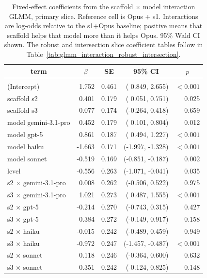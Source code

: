 \documentclass[10pt]{article} %
\begin{document}
    \begin{table}[h]
        \caption{Fixed-effect coefficients from the scaffold $\times$ model interaction GLMM, primary slice. Reference cell is Opus + s1. Interactions are log-odds relative to the s1+Opus baseline; positive means that scaffold helps that model more than it helps Opus. 95\% Wald CI shown. The robust and intersection slice coefficient tables follow in Table~\ref{tab:glmm_interaction_robust_intersection}.}
        \label{tab:h2_interaction_primary}
        \begin{center}
        \footnotesize
        \begin{tabular}{lrrrr}
            \multicolumn{1}{c}{\bf term} & \multicolumn{1}{c}{\bf $\beta$} & \multicolumn{1}{c}{\bf SE} & \multicolumn{1}{c}{\bf 95\% CI} & \multicolumn{1}{c}{\bf $p$} \\
            \hline \\
            (Intercept)                 &  1.752 & 0.461 & ( 0.849,  2.655) & $<0.001$ \\
            scaffold s2                 &  0.401 & 0.179 & ( 0.051,  0.751) & 0.025 \\
            scaffold s3                 &  0.077 & 0.174 & (-0.264,  0.418) & 0.659 \\
            model gemini-3.1-pro        &  0.452 & 0.179 & ( 0.101,  0.804) & 0.012 \\
            model gpt-5                 &  0.861 & 0.187 & ( 0.494,  1.227) & $<0.001$ \\
            model haiku                 & -1.663 & 0.171 & (-1.997, -1.328) & $<0.001$ \\
            model sonnet                & -0.519 & 0.169 & (-0.851, -0.187) & 0.002 \\
            level                       & -0.556 & 0.263 & (-1.071, -0.041) & 0.035 \\
            s2 $\times$ gemini-3.1-pro  &  0.008 & 0.262 & (-0.506,  0.522) & 0.975 \\
            s3 $\times$ gemini-3.1-pro  &  1.021 & 0.273 & ( 0.487,  1.555) & $<0.001$ \\
            s2 $\times$ gpt-5           & -0.214 & 0.270 & (-0.743,  0.315) & 0.427 \\
            s3 $\times$ gpt-5           &  0.384 & 0.272 & (-0.149,  0.917) & 0.158 \\
            s2 $\times$ haiku           & -0.015 & 0.242 & (-0.489,  0.459) & 0.949 \\
            s3 $\times$ haiku           & -0.972 & 0.247 & (-1.457, -0.487) & $<0.001$ \\
            s2 $\times$ sonnet          &  0.118 & 0.246 & (-0.364,  0.600) & 0.632 \\
            s3 $\times$ sonnet          &  0.351 & 0.242 & (-0.124,  0.825) & 0.148 \\
        \end{tabular}
        \end{center}
        \end{table}
\end{document}
